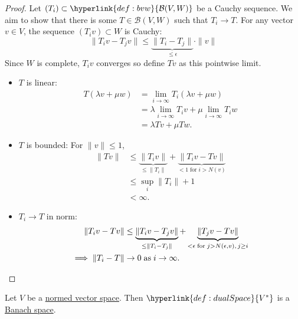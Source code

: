 \documentclass{article}
\begin{document}
\begin{proof}
    Let $(T_i) \subset \hyperlink{def:bvw}{\mathcal{B}(V, W)}$ be a Cauchy sequence.
    We aim to show that there is some $T \in \mathcal{B}(V, W)$ such that $T_i \to T$.
    For any vector $v \in V$, the sequence $(T_i v) \subset W$ is Cauchy:
    \begin{equation*}
        \|T_i v - T_j v\| \leq \underbrace{\|T_i - T_j\|}_{\leq \epsilon} \cdot \|v\|
    \end{equation*}
    Since $W$ is complete, $T_i v$ converges so define $T v$ as this pointwise limit.
    \begin{itemize}
        \item $T$ is linear:
            \begin{align*}
                T(\lambda v + \mu w) &= \lim_{i \to \infty} T_i (\lambda v + \mu w) \\
                                     &= \lambda \lim_{i \to \infty} T_i v + \mu \lim_{i \to \infty} T_i w \\
                                     &= \lambda T v + \mu T w.
            \end{align*}
        \item $T$ is bounded:
            For $\|v\| \leq 1$,
            \begin{align*}
                \|Tv\| &\leq \underbrace{\|T_i v\|}_{\leq \|T_i\|} + \underbrace{\|T_i v - T v\|}_{<1 \; \text{for} \; i > N(v)} \\
                &\leq \sup_i \|T_i\| + 1\\
                &< \infty.
            \end{align*}

        \item $T_i \to T$ in norm:
            \begin{align*}
                \|T_i v - T v\| &\leq \underbrace{\|T_i v - T_j v\|}_{\leq \|T_i - T_j\|} + \underbrace{\|T_j v - T v\|}_{< \epsilon \; \text{for} \; j > N(\epsilon, v),\, j \geq i} \\
                \implies \|T_i - T\| &\to 0 \; \text{as} \; i \to \infty. \qedhere
            \end{align*}
    \end{itemize}
\end{proof}

\begin{cor}
    Let $V$ be a \hyperlink{def:nvs}{normed vector space}. Then $\hyperlink{def:dualSpace}{V^*}$ is a \hyperlink{def:banach}{Banach space}.
\end{cor}
\end{document}
